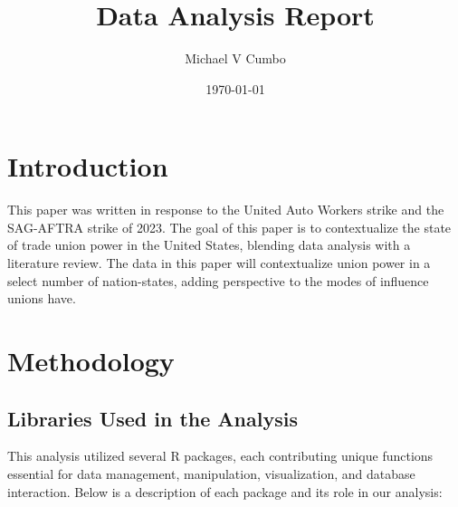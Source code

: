 \documentclass[11pt]{article}\usepackage[]{graphicx}\usepackage[]{xcolor}
\title{\textbf{Data Analysis Report}}
\author{Michael V Cumbo}
\date{\today}
\begin{document}
\maketitle

\section{Introduction}
This paper was written in response to the United Auto Workers strike and the SAG-AFTRA strike of 2023. The goal of this paper is to contextualize the state of trade union power in the United States, blending data analysis with a literature review. The data in this paper will contextualize union power in a select number of nation-states, adding perspective to the modes of influence unions have.

\section{Methodology}
\subsection*{Libraries Used in the Analysis}

This analysis utilized several R packages, each contributing unique functions essential for data management, manipulation, visualization, and database interaction. Below is a description of each package and its role in our analysis:
\end{document}
